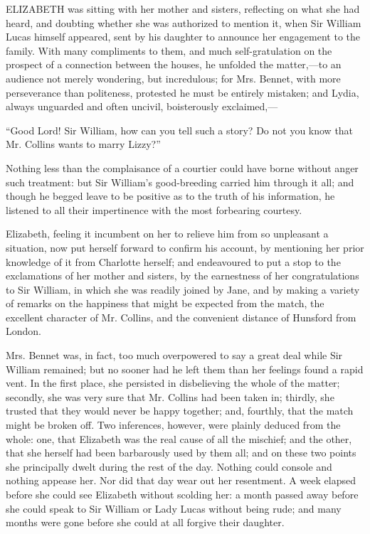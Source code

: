 \documentclass[12pt,openright]{book}
\begin{document}
\noindent  ELIZABETH was sitting with her mother and sisters, reflecting on what she had heard, and doubting whether she was authorized to mention it, when Sir William Lucas himself appeared, sent by his daughter to announce her engagement to the family. With many compliments to them, and much self-gratulation on the prospect of a connection between the houses, he unfolded the matter,—to an audience not merely wondering, but incredulous; for Mrs. Bennet, with more perseverance than politeness, protested he must be entirely mistaken; and Lydia, always unguarded and often uncivil, boisterously exclaimed,—

“Good Lord! Sir William, how can you tell such a story? Do not you know that Mr. Collins wants to marry Lizzy?”

Nothing less than the complaisance of a courtier could have borne without anger such treatment: but Sir William’s good-breeding carried him through it all; and though he begged leave to be positive as to the truth of his information, he listened to all their impertinence with the most forbearing courtesy.

Elizabeth, feeling it incumbent on her to relieve him from so unpleasant a situation, now put herself forward to confirm his account, by mentioning her prior knowledge of it from Charlotte herself; and endeavoured to put a stop to the exclamations of her mother and sisters, by the earnestness of her congratulations to Sir William, in which she was readily joined by Jane, and by making a variety of remarks on the happiness that might be expected from the match, the excellent character of Mr. Collins, and the convenient distance of Hunsford from London.

Mrs. Bennet was, in fact, too much overpowered to say a great deal while Sir William remained; but no sooner had he left them than her feelings found a rapid vent. In the first place, she persisted in disbelieving the whole of the matter; secondly, she was very sure that Mr. Collins had been taken in; thirdly, she trusted that they would never be happy together; and, fourthly, that the match might be broken off. Two inferences, however, were plainly deduced from the whole: one, that Elizabeth was the real cause of all the mischief; and the other, that she herself had been barbarously used by them all; and on these two points she principally dwelt during the rest of the day. Nothing could console and nothing appease her. Nor did that day wear out her resentment. A week elapsed before she could see Elizabeth without scolding her: a month passed away before she could speak to Sir William or Lady Lucas without being rude; and many months were gone before she could at all forgive their daughter.
\end{document}

